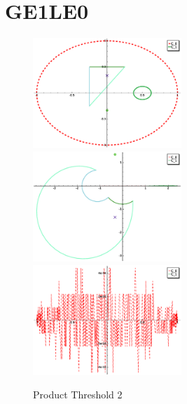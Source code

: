 \documentclass[a4paper,10pt]{article}
\title{}
\author{}
\begin{document}
\maketitle

\section{GE1LE0}
\graphicspath{{./GE1LE0PT2/}}
\begin{figure}[!ht]
\caption{Product Threshold 2}
\includegraphics[width=0.5\textwidth]{circle_plot.eps}
\includegraphics[width=0.5\textwidth]{zedplot.eps}
\includegraphics[width=0.5\textwidth]{zedplot_C0.eps}
\end{figure}
\end{document}
